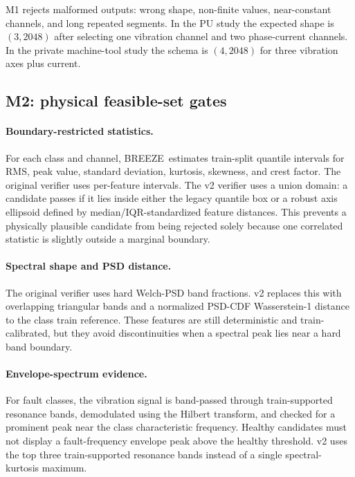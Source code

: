 \documentclass[review,3p,times]{elsarticle}
\newcommand{\breeze}{BREEZE}
\begin{document}
M1 rejects malformed outputs: wrong shape, non-finite values, near-constant
channels, and long repeated segments. In the PU study the expected shape is
$(3,2048)$ after selecting one vibration channel and two phase-current
channels. In the private machine-tool study the schema is $(4,2048)$ for
three vibration axes plus current.

\subsection{M2: physical feasible-set gates}

\paragraph{Boundary-restricted statistics.}
For each class and channel, \breeze\ estimates train-split quantile intervals
for RMS, peak value, standard deviation, kurtosis, skewness, and crest factor.
The original verifier uses per-feature intervals. The v2 verifier uses a union
domain: a candidate passes if it lies inside either the legacy quantile box or
a robust axis ellipsoid defined by median/IQR-standardized feature distances.
This prevents a physically plausible candidate from being rejected solely
because one correlated statistic is slightly outside a marginal boundary.

\paragraph{Spectral shape and PSD distance.}
The original verifier uses hard Welch-PSD band fractions. v2 replaces this
with overlapping triangular bands and a normalized PSD-CDF Wasserstein-1
distance to the class train reference. These features are still deterministic
and train-calibrated, but they avoid discontinuities when a spectral peak lies
near a hard band boundary.

\paragraph{Envelope-spectrum evidence.}
For fault classes, the vibration signal is band-passed through train-supported
resonance bands, demodulated using the Hilbert transform, and checked for a
prominent peak near the class characteristic frequency. Healthy candidates
must not display a fault-frequency envelope peak above the healthy threshold.
v2 uses the top three train-supported resonance bands instead of a single
spectral-kurtosis maximum.
\end{document}
